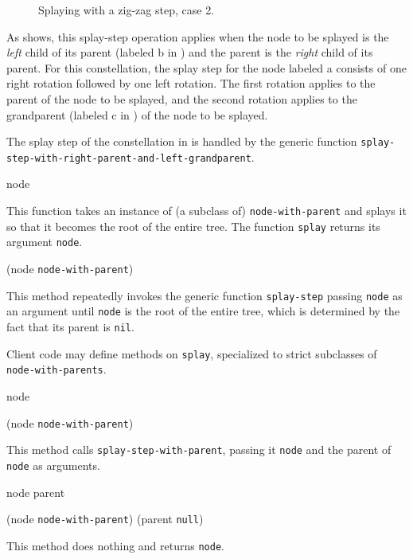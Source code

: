 \begin{figure}
\begin{center}
\end{center}
\caption{\label{fig-splay-zig-zag-2}
Splaying with a zig-zag step, case 2.}
\end{figure}

As  shows, this splay-step operation
applies when the node to be splayed is the \emph{left} child of its
parent (labeled \textsf{b} in ) and the
parent is the \emph{right} child of its parent.  For this
constellation, the splay step for the node labeled \textsf{a} consists
of one right rotation followed by one left rotation.  The first
rotation applies to the parent of the node to be splayed, and the
second rotation applies to the grandparent (labeled \textsf{c} in
) of the node to be splayed.

The splay step of the constellation in  is
handled by the generic function
\texttt{splay-step-with-right-parent-and-left-grandparent}.

 {node}

This function takes an instance of (a subclass of)
\texttt{node-with-parent} and splays it so that it becomes the root of
the entire tree.  The function \texttt{splay} returns its argument
\texttt{node}.

 {(node \texttt{node-with-parent})}

This method repeatedly invokes the generic function
\texttt{splay-step} passing \texttt{node} as an argument until
\texttt{node} is the root of the entire tree, which is determined by
the fact that its parent is \texttt{nil}.

Client code may define methods on \texttt{splay}, specialized to
strict subclasses of \texttt{node-with-parents}.

 {node}

 {(node \texttt{node-with-parent})}

This method calls \texttt{splay-step-with-parent}, passing it
\texttt{node} and the parent of \texttt{node} as arguments.

 {node parent}

{(node \texttt{node-with-parent}) (parent \texttt{null})}

This method does nothing and returns \texttt{node}.

